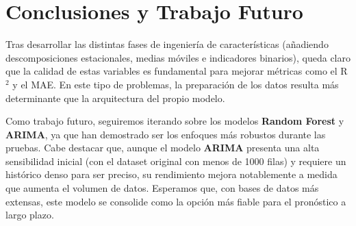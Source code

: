 \section{Conclusiones y Trabajo Futuro}
Tras desarrollar las distintas fases de ingeniería de características (añadiendo descomposiciones estacionales, medias móviles e indicadores binarios), queda claro que la calidad de estas variables es fundamental para mejorar métricas como el R$^2$ y el MAE. En este tipo de problemas, la preparación de los datos resulta más determinante que la arquitectura del propio modelo.

Como trabajo futuro, seguiremos iterando sobre los modelos \textbf{Random Forest} y \textbf{ARIMA}, ya que han demostrado ser los enfoques más robustos durante las pruebas. Cabe destacar que, aunque el modelo \textbf{ARIMA} presenta una alta sensibilidad inicial (con el dataset original con menos de 1000 filas) y requiere un histórico denso para ser preciso, su rendimiento mejora notablemente a medida que aumenta el volumen de datos. Esperamos que, con bases de datos más extensas, este modelo se consolide como la opción más fiable para el pronóstico a largo plazo.
